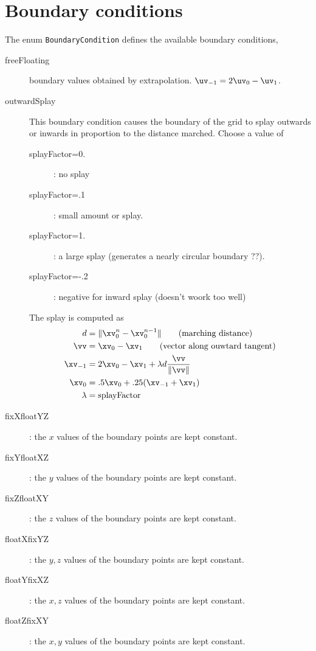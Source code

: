 \section{Boundary conditions}

The enum {\tt BoundaryCondition} defines the available boundary conditions,
\begin{description}
 \item[freeFloating] boundary values obtained by extrapolation. $\uv_{-1}=2\uv_0-\uv_1$.
 \item[outwardSplay] This boundary condition causes the boundary of the grid to splay outwards
    or inwards in proportion to the distance marched.
    Choose a value of
    \begin{description}
       \item[splayFactor=0.] :  no splay
       \item[splayFactor=.1] : small amount or splay.
       \item[splayFactor=1.] : a large splay (generates a nearly circular boundary ??).
       \item[splayFactor=-.2] : negative for inward splay (doesn't woork too well)
    \end{description}
    The splay is computed as
  \begin{align*}
    d & = \| \xv_0^n - \xv_0^{n-1} \| \qquad \mbox{(marching distance)}\\
    \vv &= \xv_0-\xv_1  \qquad \mbox{(vector along ouwtard tangent)} \\
    \xv_{-1} &= 2 \xv_0 - \xv_1 + \lambda d {\vv\over \| \vv \| }  \\
    \xv_0  &= .5 \xv_0 + .25( \xv_{-1} + \xv_1 ) \\
    \lambda &= \mbox{splayFactor}
  \end{align*}
 \item[fixXfloatYZ] : the $x$ values of the boundary points  are kept constant.
 \item[fixYfloatXZ] : the $y$ values of the boundary points  are kept constant.
 \item[fixZfloatXY] : the $z$ values of the boundary points  are kept constant. 
 \item[floatXfixYZ] : the $y,z$ values of the boundary points  are kept constant.
 \item[floatYfixXZ] : the $x,z$ values of the boundary points  are kept constant.
 \item[floatZfixXY] : the $x,y$ values of the boundary points  are kept constant.

\end{description}
